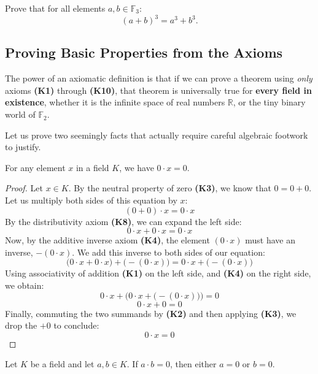 \begin{exercise}
\label{exc:frobenius_f3}
Prove that for all elements $a, b \in \mathbb{F}_3$:
\[
(a + b)^3 = a^3 + b^3.
\]
\end{exercise}

\subsection{Proving Basic Properties from the Axioms}

The power of an axiomatic definition is that if we can prove a theorem using \textit{only} axioms \textbf{(K1)} through \textbf{(K10)}, that theorem is universally true for \textbf{every field in existence}, whether it is the infinite space of real numbers $\mathbb{R}$, or the tiny binary world of $\mathbb{F}_2$.

Let us prove two seemingly  facts that actually require careful algebraic footwork to justify.

\begin{lemma}
\label{lem:mult_by_zero}
For any element $x$ in a field $K$, we have $0 \cdot x = 0$.
\end{lemma}

\begin{proof}
Let $x \in K$. By the neutral property of zero \textbf{(K3)}, we know that $0 = 0 + 0$. 
Let us multiply both sides of this equation by $x$:
\[
(0 + 0) \cdot x = 0 \cdot x
\]
By the distributivity axiom \textbf{(K8)}, we can expand the left side:
\[
0 \cdot x + 0 \cdot x = 0 \cdot x
\]
Now, by the additive inverse axiom \textbf{(K4)}, the element $(0 \cdot x)$ must have an inverse, $-(0 \cdot x)$. We add this inverse to both sides of our equation:
\[
\big(0 \cdot x + 0 \cdot x\big) + \big(-(0 \cdot x)\big) = 0 \cdot x + \big(-(0 \cdot x)\big)
\]
Using associativity of addition \textbf{(K1)} on the left side, and \textbf{(K4)} on the right side, we obtain:
\[
0 \cdot x + \Big(0 \cdot x + \big(-(0 \cdot x)\big)\Big) = 0
\]
\[
0 \cdot x + 0 = 0
\]
Finally, commuting the two summands by \textbf{(K2)} and then applying \textbf{(K3)}, we drop the $+ 0$ to conclude:
\[
0 \cdot x = 0
\]
\end{proof}

\begin{lemma}
\label{lem:no_zero_divisors}
Let $K$ be a field and let $a, b \in K$. If $a \cdot b = 0$, then either $a = 0$ or $b = 0$.
\end{lemma}

